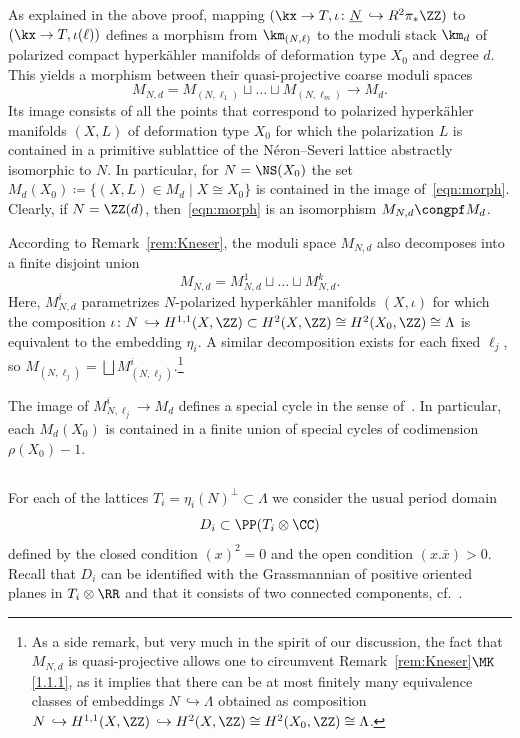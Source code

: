 As explained in the above proof, mapping $(\kx\to T,\iota\colon \underline N\,\hookrightarrow R^2\pi_*\ZZ)$ to $(\kx\to T,\iota(\ell))$ defines a morphism from $\km_{(N,\ell)}$ to the moduli stack $\km_d$ of polarized compact hyperk\"ahler manifolds of deformation type $X_0$ and degree $d$. This yields a morphism between their quasi-projective coarse moduli spaces
\begin{equation}\label{eqn:morph}
M_{N,d}=M_{(N,\ell_1)}\sqcup\dots\sqcup M_{(N,\ell_m)}\to M_d.
\end{equation}
Its image consists of all the points that correspond to polarized hyperk\"ahler manifolds $(X,L)$ of deformation type $X_0$ for which the polarization $L$ is contained in a primitive sublattice of the N\'eron--Severi lattice abstractly isomorphic to $N$. In particular, for $N= \NS(X_0)$ the set $M_d(X_0)\coloneqq \{(X,L)\in M_d\mid X\cong X_0\}$ is contained in the image of~\eqref{eqn:morph}. Clearly, if $N=\ZZ(d)$, then~\eqref{eqn:morph} is an isomorphism $M_{N,d}\congpf M_d$.

According to Remark~\ref{rem:Kneser}, the moduli space $M_{N,d}$ also decomposes into a finite disjoint
union
\[
M_{N,d}=M^1_{N,d}\sqcup \dots \sqcup M_{N,d}^k.
\]
Here, $M^i_{N,d}$ parametrizes $N$-polarized hyperk\"ahler manifolds $(X,\iota)$ for which the composition $\iota\colon N\,\hookrightarrow H^{1,1}(X,\ZZ)\subset H^2(X,\ZZ)\cong H^2(X_0,\ZZ)\cong \Lambda$ is equivalent to the embedding $\eta_i$. A similar decomposition exists for each fixed $\ell_j$, so $M_{(N,\ell_j)}=\bigsqcup M^i_{(N,\ell_j)}$.\footnote{As a side remark, but very much in the spirit of our discussion, the fact that $M_{N,d}$ is quasi-projective allows one to circumvent Remark~\ref{rem:Kneser}$\MK$\eqref{1.1.1}, as it implies that there can be at most finitely many equivalence classes of embeddings $N\,\hookrightarrow \Lambda$ obtained as composition $N\,\hookrightarrow H^{1,1}(X,\ZZ)\,\hookrightarrow H^2(X,\ZZ)\cong H^2(X_0,\ZZ)\cong\Lambda$.}

\begin{rema}
The image of $M^i_{N,\ell_j}\to M_d$ defines a special cycle in the sense of~\cite{Kudla}. In particular, each $M_d(X_0)$ is contained in a finite union of special cycles of codimension $\rho(X_0)-1$.
\end{rema}

\subsection{}
For each of the lattices $T_i=\eta_i(N)^\perp\subset\Lambda$ we consider the
usual period domain
\[
D_i\subset \PP(T_i\otimes\CC)
\]
defined by the
closed condition $(x)^2=0$ and the open condition $(x.\bar x)>0$. Recall that $D_i$ can be identified with the Grassmannian of positive oriented planes in $T_i\otimes \RR$ and that it consists of two connected components, cf.~\cite[Chapter~6]{HuyK3}.

